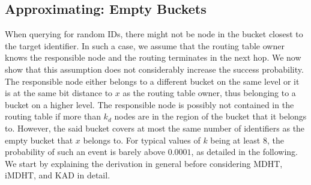 \documentclass[10pt, conference, compsocconf, letterpaper]{IEEEtran}
\begin{document}
\subsection{Approximating: Empty Buckets}
\label{sec:approximation}
When querying for random IDs, there might not
be node in the bucket closest to the target identifier.
In such a case, we assume that the routing table owner knows the responsible node and the
routing terminates in the next hop.
We now show that this assumption does not considerably increase the success probability.
The responsible node either belongs to a different bucket on the same level or it is at the same
bit distance to $x$ as the routing table owner, thus belonging to a bucket on a higher level.
The responsible node is possibly not contained in the routing table if more than $k_d$ nodes
are in the region of the bucket that it belongs to.
However, the said bucket covers at most the same number of identifiers as the empty bucket that $x$ belongs to. For typical values of $k$ being at least 8, the probability 
of such an event is barely above $0.0001$, as detailed in the following.
We start by explaining the derivation in general before considering
MDHT, iMDHT, and KAD in detail.
\end{document}
